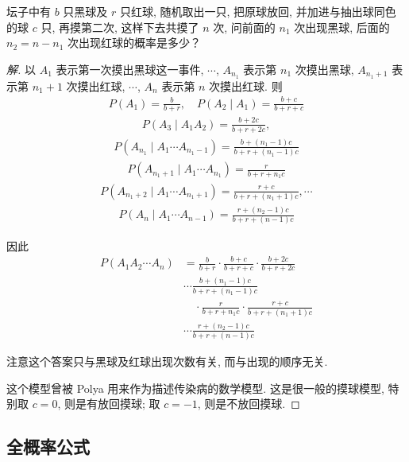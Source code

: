 \documentclass[../../main.tex]{subfiles}
\begin{document}
\begin{example}\label{example:ch02-Polya坛子模型}
坛子中有 $b$ 只黑球及 $r$ 只红球, 随机取出一只, 把原球放回, 并加进与抽出球同色的球 $c$ 只, 再摸第二次, 这样下去共摸了 $n$ 次, 问前面的 $n_1$ 次出现黑球, 后面的 $n_2=n-n_1$ 次出现红球的概率是多少？

\begin{proof}[解]
以 $A_1$ 表示第一次摸出黑球这一事件, $\cdots$, $A_{n_1}$ 表示第 $n_1$ 次摸出黑球, $A_{n_1+1}$ 表示第 $n_1+1$ 次摸出红球, $\cdots$, $A_n$ 表示第 $n$ 次摸出红球. 则
\begin{align*}
P(A_1)=\frac{b}{b+r},\quad P(A_2\mid A_1)=\frac{b+c}{b+r+c}
\end{align*}
\begin{align*}
P(A_3\mid A_1A_2)=\frac{b+2c}{b+r+2c},
\end{align*}
\begin{align*}
P(A_{n_1}\mid A_1\cdots A_{n_1-1})=\frac{b+(n_1-1)c}{b+r+(n_1-1)c}
\end{align*}
\begin{align*}
P(A_{n_1+1}\mid A_1\cdots A_{n_1})=\frac{r}{b+r+n_1c}
\end{align*}
\begin{align*}
P(A_{n_1+2}\mid A_1\cdots A_{n_1+1})=\frac{r+c}{b+r+(n_1+1)c},\cdots
\end{align*}
\begin{align*}
P(A_n\mid A_1\cdots A_{n-1})=\frac{r+(n_2-1)c}{b+r+(n-1)c}
\end{align*}

因此
\begin{align*}
P(A_1A_2\cdots A_n)&=\frac{b}{b+r}\cdot\frac{b+c}{b+r+c}\cdot\frac{b+2c}{b+r+2c}\\
&\cdots\frac{b+(n_1-1)c}{b+r+(n_1-1)c}\\
&\quad\cdot\frac{r}{b+r+n_1c}\cdot\frac{r+c}{b+r+(n_1+1)c}\\
&\cdots\frac{r+(n_2-1)c}{b+r+(n-1)c}
\end{align*}

注意这个答案只与黑球及红球出现次数有关, 而与出现的顺序无关.

这个模型曾被 Polya 用来作为描述传染病的数学模型. 这是很一般的摸球模型, 特别取 $c=0$, 则是有放回摸球; 取 $c=-1$, 则是不放回摸球.
\end{proof}
\end{example}

\subsection{全概率公式}
\end{document}
